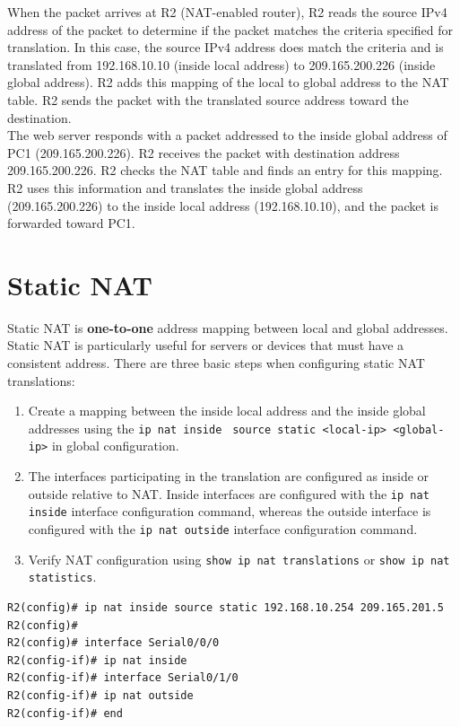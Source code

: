 When the packet arrives at R2 (NAT-enabled router), R2 reads the source IPv4 address of the packet to determine if the packet matches the criteria specified for translation. In this case, the source IPv4 address does match the criteria and is translated from 192.168.10.10 (inside local address) to 209.165.200.226 (inside global address). R2 adds this mapping of the local to global address to the NAT table. R2 sends the packet with the translated source address toward the destination.\\

The web server responds with a packet addressed to the inside global address of PC1 (209.165.200.226). R2 receives the packet with destination address 209.165.200.226. R2 checks the NAT table and finds an entry for this mapping. R2 uses this information and translates the inside global address (209.165.200.226) to the inside local address (192.168.10.10), and the packet is forwarded toward PC1.

\section{Static NAT}

Static NAT is \textbf{one-to-one} address mapping between local and global addresses. Static NAT is particularly useful for servers or devices that must have a consistent address. There are three basic steps when configuring static NAT translations:

\begin{enumerate}
\item Create a mapping between the inside local address and the inside global addresses using the \verb|ip nat inside | \verb|source static <local-ip> <global-ip>| in global configuration.

\item The interfaces participating in the translation are configured as inside or outside relative to NAT. Inside interfaces are configured with the \verb|ip nat inside| interface configuration command, whereas the outside interface is configured with the \verb|ip nat outside| interface configuration command.

\item Verify NAT configuration using \verb|show ip nat translations| or \verb|show ip nat statistics|.
\end{enumerate}

\begin{verbatim}
R2(config)# ip nat inside source static 192.168.10.254 209.165.201.5
R2(config)#
R2(config)# interface Serial0/0/0
R2(config-if)# ip nat inside
R2(config-if)# interface Serial0/1/0
R2(config-if)# ip nat outside
R2(config-if)# end
\end{verbatim}

